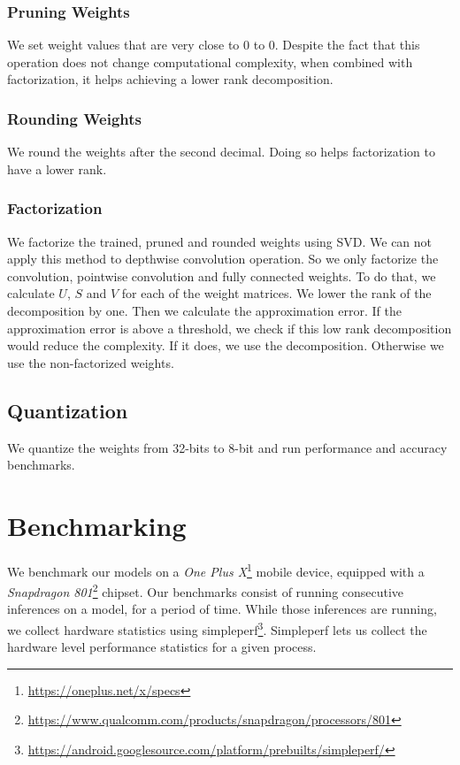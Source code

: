 \subsubsection{Pruning Weights}
We set weight values that are very close to $0$ to $0$. Despite the fact that this operation does not change computational complexity, when combined with factorization, it helps achieving a lower rank decomposition.

\subsubsection{Rounding Weights}
We round the weights after the second decimal. Doing so helps factorization to have a lower rank. 

\subsubsection{Factorization}
We factorize the trained, pruned and rounded weights using SVD. We can not apply this method to depthwise convolution operation. So we only factorize the convolution, pointwise convolution and fully connected weights. To do that, we calculate $U$, $S$ and $V$ for each of the weight matrices. We lower the rank of the decomposition by one. Then we calculate the approximation error. If the approximation error is above a threshold, we check if this low rank decomposition would reduce the complexity. If it does, we use the decomposition. Otherwise we use the non-factorized weights. 

\subsection{Quantization}
We quantize the weights from 32-bits to 8-bit and run performance and accuracy benchmarks.

\section{Benchmarking}
We benchmark our models on a \textit{One Plus X}\footnote{\url{https://oneplus.net/x/specs}} mobile device, equipped with a \textit{Snapdragon 801}\footnote{\url{https://www.qualcomm.com/products/snapdragon/processors/801}} chipset. Our benchmarks consist of running consecutive inferences on a model, for a period of time. While those inferences are running, we collect hardware statistics using simpleperf\footnote{\url{https://android.googlesource.com/platform/prebuilts/simpleperf/}}. Simpleperf lets us collect the hardware level performance statistics for a given process.

